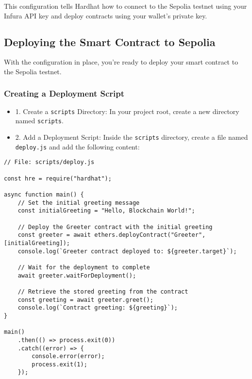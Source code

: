 \documentclass[12pt]{article}
\begin{document}
\noindent
This configuration tells Hardhat how to connect to the Sepolia testnet using your Infura API key and deploy contracts using your wallet's private key.

\subsection{Deploying the Smart Contract to Sepolia}

With the configuration in place, you're ready to deploy your smart contract to
the Sepolia testnet.

\subsubsection{Creating a Deployment Script}

\begin{itemize}
    \item 1. Create a \texttt{scripts} Directory: In your project root, create a new directory named \texttt{scripts}.

    \item 2. Add a Deployment Script: Inside the \texttt{scripts} directory, create a file named \texttt{deploy.js} and add the following content:
\end{itemize}

\noindent
\begin{minipage}[c]{\textwidth}
    \begin{verbatim}
// File: scripts/deploy.js

const hre = require("hardhat");

async function main() {
    // Set the initial greeting message
    const initialGreeting = "Hello, Blockchain World!";
    
    // Deploy the Greeter contract with the initial greeting
    const greeter = await ethers.deployContract("Greeter", [initialGreeting]);
    console.log(`Greeter contract deployed to: ${greeter.target}`);

    // Wait for the deployment to complete
    await greeter.waitForDeployment();

    // Retrieve the stored greeting from the contract
    const greeting = await greeter.greet();
    console.log(`Contract greeting: ${greeting}`);
}

main()
    .then(() => process.exit(0))
    .catch((error) => {
        console.error(error);
        process.exit(1);
    });
\end{verbatim}
\end{minipage}
\end{document}
